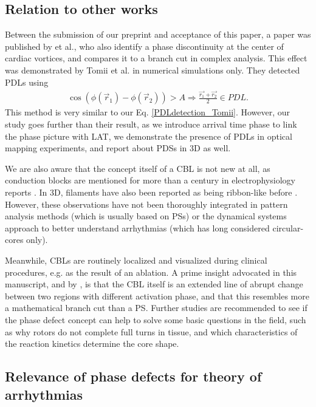 \documentclass{article}
\begin{document}
\subsection{Relation to other works}

Between the submission of our preprint \cite{Arno:2021arxiv} and acceptance of this paper, a paper was published by \cite{Tomii:2021} et al., who also identify a phase discontinuity at the center of cardiac vortices, and compares it to a branch cut in complex analysis. This effect was demonstrated by Tomii et al. in numerical simulations only. They detected PDLs using
\begin{align}
\cos ( \phi(\vec{r}_1) - \phi(\vec{r}_2)) > A     \Rightarrow \frac{\vec{r_1} + \vec{r_2}}{2} \in PDL.  \label{PDLdetection_Tomii}
\end{align}
This method is very similar to our Eq. \eqref{PDLdetection_Tomii}. However, our study goes further than their result, as we introduce arrival time phase to link the phase picture with LAT, we demonstrate the presence of PDLs in optical mapping experiments, and report about PDSs in 3D as well. 

We are also aware that the concept itself of a CBL is not new at all, as conduction blocks are mentioned for more than a century in electrophysiology reports \citep{Mines:1913}. In 3D, filaments have also been reported as being ribbon-like before \citep{Efimov:1999}. However, these observations have not been thoroughly integrated in pattern analysis methods (which is usually based on PSs) or the dynamical systems approach to better understand arrhythmias (which has long considered circular-cores only). 

Meanwhile, CBLs are routinely localized and visualized during clinical procedures, e.g. as the result of an ablation. A prime insight advocated in this manuscript, and by \cite{Tomii:2021}, is that the CBL itself is an extended line of abrupt change between two regions with different activation phase, and that this resembles more a mathematical branch cut than a PS. Further studies are recommended to see if the phase defect concept can help to solve some basic questions in the field, such as why rotors do not complete full turns in tissue, and which characteristics of the reaction kinetics determine the core shape. 

\subsection{Relevance of phase defects for theory of arrhythmias}
\end{document}
